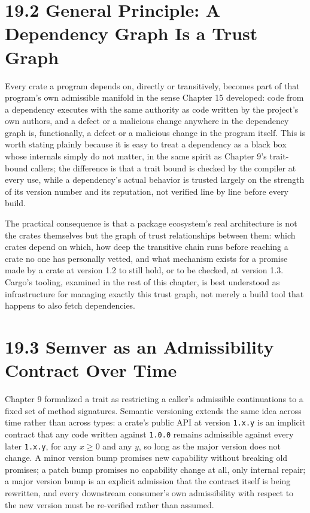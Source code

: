 \documentclass[11pt]{book}
\begin{document}
\section*{19.2 General Principle: A Dependency Graph Is a Trust Graph}

Every crate a program depends on, directly or transitively, becomes part of that program's own admissible manifold in the sense Chapter 15 developed: code from a dependency executes with the same authority as code written by the project's own authors, and a defect or a malicious change anywhere in the dependency graph is, functionally, a defect or a malicious change in the program itself. This is worth stating plainly because it is easy to treat a dependency as a black box whose internals simply do not matter, in the same spirit as Chapter 9's trait-bound callers; the difference is that a trait bound is checked by the compiler at every use, while a dependency's actual behavior is trusted largely on the strength of its version number and its reputation, not verified line by line before every build.

The practical consequence is that a package ecosystem's real architecture is not the crates themselves but the graph of trust relationships between them: which crates depend on which, how deep the transitive chain runs before reaching a crate no one has personally vetted, and what mechanism exists for a promise made by a crate at version 1.2 to still hold, or to be checked, at version 1.3. Cargo's tooling, examined in the rest of this chapter, is best understood as infrastructure for managing exactly this trust graph, not merely a build tool that happens to also fetch dependencies.

\section*{19.3 Semver as an Admissibility Contract Over Time}

Chapter 9 formalized a trait as restricting a caller's admissible continuations to a fixed set of method signatures. Semantic versioning extends the same idea across time rather than across types: a crate's public API at version \texttt{1.x.y} is an implicit contract that any code written against \texttt{1.0.0} remains admissible against every later \texttt{1.x.y}, for any $x \geq 0$ and any $y$, so long as the major version does not change. A minor version bump promises new capability without breaking old promises; a patch bump promises no capability change at all, only internal repair; a major version bump is an explicit admission that the contract itself is being rewritten, and every downstream consumer's own admissibility with respect to the new version must be re-verified rather than assumed.
\end{document}
